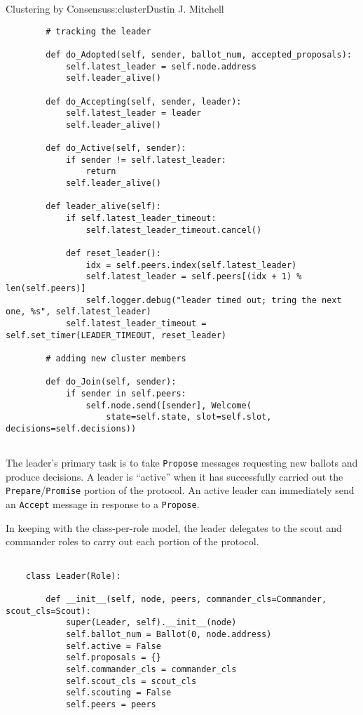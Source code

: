 \begin{aosachapter}{Clustering by Consensus}{s:cluster}{Dustin J. Mitchell}
\begin{verbatim}
        # tracking the leader
    
        def do_Adopted(self, sender, ballot_num, accepted_proposals):
            self.latest_leader = self.node.address
            self.leader_alive()
    
        def do_Accepting(self, sender, leader):
            self.latest_leader = leader
            self.leader_alive()
    
        def do_Active(self, sender):
            if sender != self.latest_leader:
                return
            self.leader_alive()
    
        def leader_alive(self):
            if self.latest_leader_timeout:
                self.latest_leader_timeout.cancel()
    
            def reset_leader():
                idx = self.peers.index(self.latest_leader)
                self.latest_leader = self.peers[(idx + 1) % len(self.peers)]
                self.logger.debug("leader timed out; tring the next one, %s", self.latest_leader)
            self.latest_leader_timeout = self.set_timer(LEADER_TIMEOUT, reset_leader)
    
        # adding new cluster members
    
        def do_Join(self, sender):
            if sender in self.peers:
                self.node.send([sender], Welcome(
                    state=self.state, slot=self.slot, decisions=self.decisions))
    
\end{verbatim}

\label{leader-scout-and-commander}

The leader's primary task is to take \texttt{Propose} messages
requesting new ballots and produce decisions. A leader is ``active''
when it has successfully carried out the
\texttt{Prepare}/\texttt{Promise} portion of the protocol. An active
leader can immediately send an \texttt{Accept} message in response to a
\texttt{Propose}.

In keeping with the class-per-role model, the leader delegates to the
scout and commander roles to carry out each portion of the protocol.

\begin{verbatim}

    class Leader(Role):
    
        def __init__(self, node, peers, commander_cls=Commander, scout_cls=Scout):
            super(Leader, self).__init__(node)
            self.ballot_num = Ballot(0, node.address)
            self.active = False
            self.proposals = {}
            self.commander_cls = commander_cls
            self.scout_cls = scout_cls
            self.scouting = False
            self.peers = peers
    

\end{verbatim}
\end{aosachapter}
